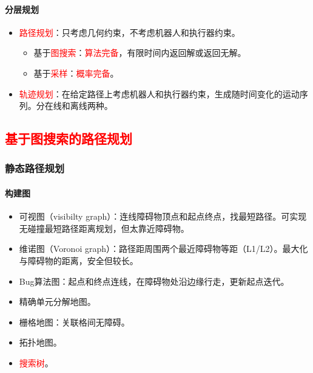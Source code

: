 \documentclass[
12pt, %
a4paper, 
oneside, %
]{scrartcl}
\begin{document}
\paragraph{分层规划}
\begin{itemize}
\item \textcolor{red}{路径规划}：只考虑几何约束，不考虑机器人和执行器约束。
\begin{itemize}
\item 基于\textcolor{red}{图搜索}：\textcolor{red}{算法完备}，有限时间内返回解或返回无解。
\item 基于\textcolor{red}{采样}：\textcolor{red}{概率完备}。
\end{itemize}
\item \textcolor{red}{轨迹规划}：在给定路径上考虑机器人和执行器约束，生成随时间变化的运动序列。分在线和离线两种。
\end{itemize}
\subsection[基于图搜索的路径规划]{\textcolor{red}{基于图搜索的路径规划}}
\subsubsection[静态路径规划]{静态路径规划}
\paragraph{构建图}
\begin{itemize}
\item 可视图（visibilty graph）：连线障碍物顶点和起点终点，找最短路径。可实现无碰撞最短路径距离规划，但太靠近障碍物。
\item 维诺图（Voronoi graph）：路径距周围两个最近障碍物等距（L1/L2）。最大化与障碍物的距离，安全但较长。
\item Bug算法图：起点和终点连线，在障碍物处沿边缘行走，更新起点迭代。
\item 精确单元分解地图。
\item 栅格地图：关联格间无障碍。
\item 拓扑地图。
\item \textcolor{red}{搜索树}。
\end{itemize}
\end{document}
